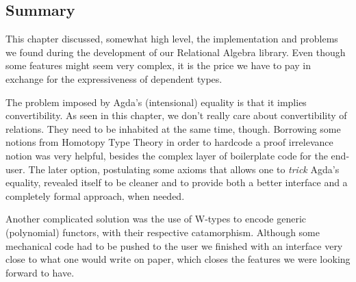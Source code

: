 \subsection{Summary}

This chapter discussed, somewhat high level, the implementation and problems
we found during the development of our Relational Algebra library. Even though some features
might seem very complex, it is the price we have to pay in exchange for the expressiveness 
of dependent types. 

The problem imposed by Agda's (intensional) equality is that it implies
convertibility. As seen in this chapter, we don't really care about convertibility of relations.
They need to be inhabited at the same time, though. 
Borrowing some notions from Homotopy Type Theory\cite{hottbook}
in order to hardcode a proof irrelevance notion was very helpful, besides the complex layer of boilerplate
code for the end-user. The later option, postulating some axioms that allows one to \emph{trick}
Agda's equality, revealed itself to be cleaner and to provide both a better interface
and a completely formal approach, when needed.

Another complicated solution was the use of W-types to encode generic (polynomial) functors,
with their respective catamorphism. Although some mechanical code had to be pushed to the user
we finished with an interface very close to what one would write on paper, which closes
the features we were looking forward to have.


